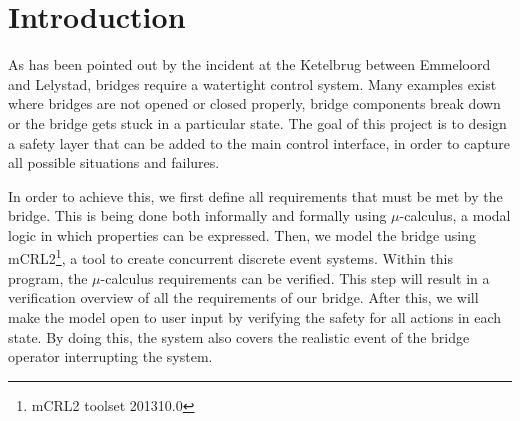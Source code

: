 \section{Introduction}

As has been pointed out by the incident at the Ketelbrug between Emmeloord and Lelystad, bridges require a watertight control system.  Many examples exist where bridges are not opened or closed properly, bridge components break down or the bridge gets stuck in a particular state. The goal of this project is to design a safety layer that can be added to the main control interface, in order to capture all possible situations and failures.

In order to achieve this, we first define all requirements that must be met by the bridge. This is being done both informally and formally using $\mu$-calculus, a modal logic in which properties can be expressed. Then, we model the bridge using mCRL2\footnote{mCRL2 toolset 201310.0}, a tool to create concurrent discrete event systems. Within this program, the $\mu$-calculus requirements can be verified. This step will result in a verification overview of all the requirements of our bridge. After this, we will make the model open to user input by verifying the safety for all actions in each state. By doing this, the system also covers the realistic event of the bridge operator interrupting the system.

